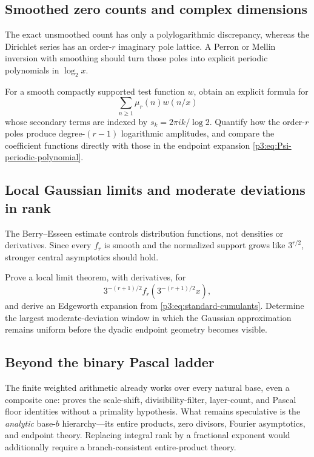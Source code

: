 \documentclass[11pt,oneside]{article}
\theoremstyle{definition}
\theoremstyle{remark}
\begin{document}
\subsection{Smoothed zero counts and complex dimensions}

The exact unsmoothed count has only a polylogarithmic discrepancy, whereas the Dirichlet series has an order-$r$ imaginary pole lattice.  A Perron or Mellin inversion with smoothing should turn those poles into explicit periodic polynomials in $\log_2x$.

\begin{frontierproblem}
For a smooth compactly supported test function $w$, obtain an explicit formula for
\[
 \sum_{n\ge1}\mu_r(n)w(n/x)
\]
whose secondary terms are indexed by $s_k=2\pi ik/\log2$.  Quantify how the order-$r$ poles produce degree-$(r-1)$ logarithmic amplitudes, and compare the coefficient functions directly with those in the endpoint expansion \eqref{p3:eq:Psi-periodic-polynomial}.
\end{frontierproblem}

\subsection{Local Gaussian limits and moderate deviations in rank}

The Berry--Esseen estimate controls distribution functions, not densities or derivatives.  Since every $f_r$ is smooth and the normalized support grows like $3^{r/2}$, stronger central asymptotics should hold.

\begin{frontierproblem}
Prove a local limit theorem, with derivatives, for
\[
 3^{-(r+1)/2}f_r\!\left(3^{-(r+1)/2}x\right),
\]
and derive an Edgeworth expansion from \eqref{p3:eq:standard-cumulants}.  Determine the largest moderate-deviation window in which the Gaussian approximation remains uniform before the dyadic endpoint geometry becomes visible.
\end{frontierproblem}

\subsection{Beyond the binary Pascal ladder}

The finite weighted arithmetic already works over every natural base, even a
composite one:  proves the scale-shift,
divisibility-filter, layer-count, and Pascal floor identities without a
primality hypothesis.  What remains speculative is the \emph{analytic}
base-$b$ hierarchy---its entire products, zero divisors, Fourier asymptotics,
and endpoint theory.  Replacing integral rank by a fractional exponent would
additionally require a branch-consistent entire-product theory.
\end{document}
